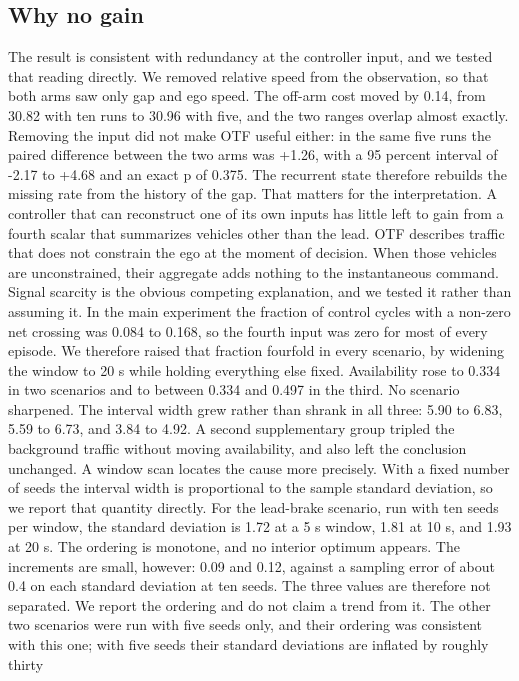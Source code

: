 \documentclass[journal]{IEEEtran}
\begin{document}
\subsection{Why no gain}
The result is consistent with redundancy at the controller input, and we tested that reading directly.
We removed relative speed from the observation, so that both arms saw only gap and ego speed. The
off-arm cost moved by 0.14, from 30.82 with ten runs to 30.96 with five, and the two ranges overlap
almost exactly. Removing the input did not make OTF useful either: in the same five runs the paired
difference between the two arms was +1.26, with a 95 percent interval of -2.17 to +4.68 and an exact
p of 0.375. The recurrent state therefore rebuilds the missing rate from the history of the gap.
That matters for the interpretation. A controller that can reconstruct one of its own inputs has little
left to gain from a fourth scalar that summarizes vehicles other than the lead. OTF describes traffic
that does not constrain the ego at the moment of decision. When those vehicles are unconstrained, their
aggregate adds nothing to the instantaneous command.
Signal scarcity is the obvious competing explanation, and we tested it rather than assuming it. In the
main experiment the fraction of control cycles with a non-zero net crossing was 0.084 to 0.168, so
the fourth input was zero for most of every episode. We therefore raised that fraction fourfold in every scenario, by widening the
window to 20 s while holding everything else fixed. Availability rose to 0.334 in two scenarios and to
between 0.334 and 0.497 in the third.
No scenario sharpened. The interval width grew rather than shrank in all three: 5.90 to 6.83, 5.59 to
6.73, and 3.84 to 4.92. A second supplementary group tripled the background traffic without moving
availability, and also left the conclusion unchanged.
A window scan locates the cause more precisely. With a fixed number of seeds the interval width is
proportional to the sample standard deviation, so we report that quantity directly. For the lead-brake
scenario, run with ten seeds per window, the standard deviation is 1.72 at a 5 s window, 1.81 at 10 s,
and 1.93 at 20 s. The ordering is monotone, and no interior optimum appears.
The increments are small, however: 0.09 and 0.12, against a sampling error of about 0.4 on each standard
deviation at ten seeds. The three values are therefore not separated. We report the ordering and do not
claim a trend from it. The other two scenarios were run with five seeds only, and their ordering was
consistent with this one; with five seeds their standard deviations are inflated by roughly thirty
\end{document}

